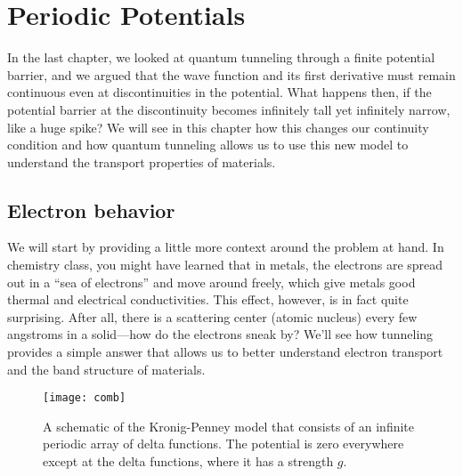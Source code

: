 %

%

\chapter{Periodic Potentials} \label{ch:period}
In the last chapter, we looked at quantum tunneling through a finite potential barrier, and we argued that the wave function and its first derivative must remain continuous even at discontinuities in the potential. What happens then, if the potential barrier at the discontinuity becomes infinitely tall yet infinitely narrow, like a huge spike? We will see in this chapter how this changes our continuity condition and how quantum tunneling allows us to use this new model to understand the transport properties of materials.


\section{Electron behavior}
We will start by providing a little more context around the problem at hand. In chemistry class, you might have learned that in metals, the electrons are spread out in a ``sea of electrons'' and move around freely, which give metals good thermal and electrical conductivities. This effect, however, is in fact quite surprising. After all, there is a scattering center (atomic nucleus) every few angstroms in a solid---how do the electrons sneak by? We'll see how tunneling provides a simple answer that allows us to better understand electron transport and the band structure of materials. \par 

\begin{figure}[!h]
	\centering
	\texttt{[image: comb]}
	\caption{A schematic of the Kronig-Penney model that consists of an infinite periodic array of delta functions. The potential is zero everywhere except at the delta functions, where it has a strength $g$.}
	\label{fig:comb}
\end{figure}

